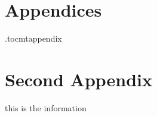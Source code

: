 \newpage
\section*{Appendices}
\appendix
\newpage
\etocdepthtag.toc{mtappendix}
\tableofcontents
\newpage



\section{Second Appendix}
this is the information

